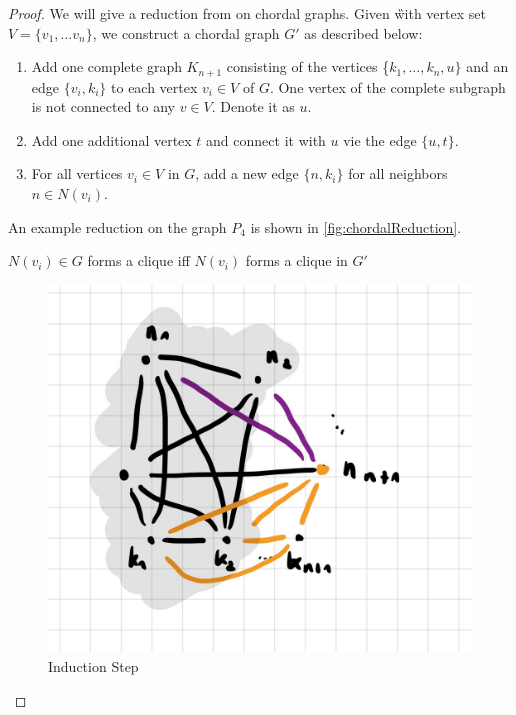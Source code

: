 \begin{proof}
    
    We will give a reduction from \dom on chordal graphs.
    Given \G with vertex set $V = \{v_1,...v_n\} $, we construct a chordal graph $G'$ as described below:
    \begin{enumerate}
        \item Add one complete graph $K_{n+1}$ consisting of the vertices \{$k_1,...,k_n,u\}$ and an edge $\{v_i, k_i\}$ to each vertex $v_i \in V$ of $G$. One vertex of the complete subgraph is not connected to any $v \in V$. Denote it as $u$.
        \item Add one additional vertex $t$ and connect it with $u$ vie the edge $\{u,t\}$.
        \item For all vertices $v_i \in V$ in $G$, add a new edge $\{n, k_i\}$ for all neighbors $n \in N(v_i)$.
    \end{enumerate}

    An example reduction on the graph $P_4$ is shown in  \cref{fig:chordalReduction}.

    \begin{corollary}\label{cliqueNeighbor}
       $N(v_i) \in G$ forms a clique iff $N(v_i)$ forms a clique in $G'$
    \end{corollary}

    \begin{subproof}

\begin{figure}[th]
    \includegraphics[scale=0.15]{pages/img/induction-step.jpg}
    \centering
    \caption{Induction Step}
    \label{fig:induction-step}
\end{figure}


\end{subproof}
\end{proof}
